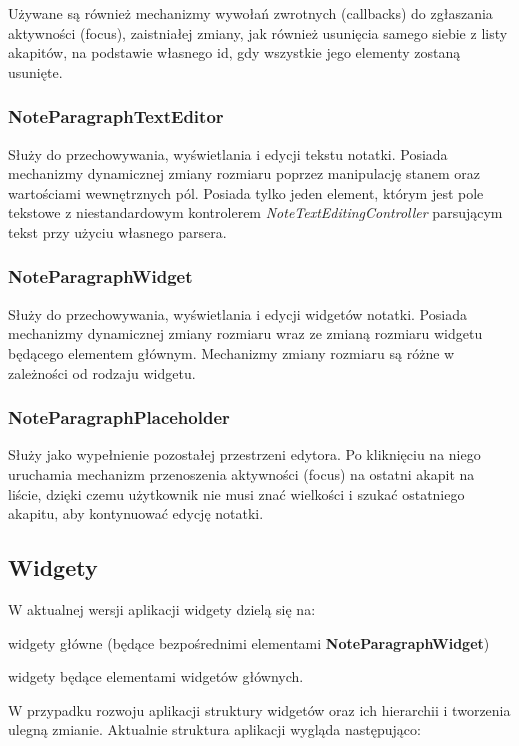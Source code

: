 Używane są również mechanizmy wywołań zwrotnych (callbacks) do zgłaszania aktywności (focus), zaistniałej zmiany, jak również usunięcia samego siebie z listy akapitów, na podstawie własnego id, gdy wszystkie jego elementy zostaną usunięte.

\subsubsection{NoteParagraphTextEditor}

Służy do przechowywania, wyświetlania i edycji tekstu notatki. Posiada mechanizmy dynamicznej zmiany rozmiaru poprzez manipulację stanem oraz wartościami wewnętrznych pól. Posiada tylko jeden element, którym jest pole tekstowe z niestandardowym kontrolerem \textit{NoteTextEditingController} parsującym tekst przy użyciu własnego parsera.

\subsubsection{NoteParagraphWidget}

Służy do przechowywania, wyświetlania i edycji widgetów notatki. Posiada mechanizmy dynamicznej zmiany rozmiaru wraz ze zmianą rozmiaru widgetu będącego elementem głównym. Mechanizmy zmiany rozmiaru są różne w zależności od rodzaju widgetu.

\subsubsection{NoteParagraphPlaceholder}

Służy jako wypełnienie pozostałej przestrzeni edytora. Po kliknięciu na niego uruchamia mechanizm przenoszenia aktywności (focus) na ostatni akapit na liście, dzięki czemu użytkownik nie musi znać wielkości i szukać ostatniego akapitu, aby kontynuować edycję notatki.

\newpage

\subsection{Widgety}

W aktualnej wersji aplikacji widgety dzielą się na:
\begin{compactitem}
    \item widgety główne (będące bezpośrednimi elementami \textbf{NoteParagraphWidget})
    \item widgety będące elementami widgetów głównych.
\end{compactitem}
W przypadku rozwoju aplikacji struktury widgetów oraz ich hierarchii i tworzenia ulegną zmianie. Aktualnie struktura aplikacji wygląda następująco:

